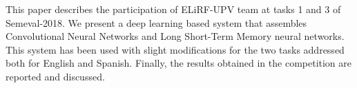 This paper describes the participation of ELiRF-UPV team at tasks 1 and 3 of Semeval-2018. We present a deep learning based system that assembles Convolutional Neural Networks and Long Short-Term Memory neural networks. This system has been used with slight modifications for the two tasks addressed both for English and Spanish. Finally, the results obtained in the competition are reported and discussed.
